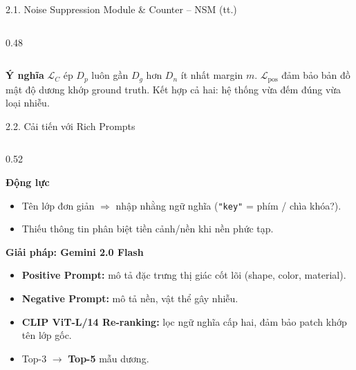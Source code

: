 \documentclass[11pt]{beamer}
\begin{document}
\begin{frame}[shrink=10]{2.1. Noise Suppression Module \& Counter -- NSM (tt.)}
\begin{columns}[T,onlytextwidth]
\begin{column}{0.48\textwidth}
\end{column}
\end{columns}

\vspace{0.3em}

\begin{block}{\textbf{Ý nghĩa}}
$\mathcal{L}_C$ ép $D_p$ luôn gần $D_g$ hơn $D_n$ ít nhất margin $m$. $\mathcal{L}_{\text{pos}}$ đảm bảo bản đồ mật độ dương khớp ground truth. Kết hợp cả hai: hệ thống vừa đếm đúng vừa loại nhiễu.
\end{block}

\end{frame}


\begin{frame}[fragile, shrink=15]{2.2. Cải tiến với Rich Prompts}
\scriptsize

\begin{columns}[T,onlytextwidth]
\begin{column}{0.52\textwidth}

\begin{block}{\textbf{Động lực}}
\begin{itemize}
  \item Tên lớp đơn giản $\Rightarrow$ nhập nhằng ngữ nghĩa (\texttt{"key"} = phím / chìa khóa?).
  \item Thiếu thông tin phân biệt tiền cảnh/nền khi nền phức tạp.
\end{itemize}
\end{block}

\begin{block}{\textbf{Giải pháp: Gemini 2.0 Flash}}
\begin{itemize}
  \item \textbf{Positive Prompt:} mô tả đặc trưng thị giác cốt lõi (shape, color, material).
  \item \textbf{Negative Prompt:} mô tả nền, vật thể gây nhiễu.
  \item \textbf{CLIP ViT-L/14 Re-ranking:} lọc ngữ nghĩa cấp hai, đảm bảo patch khớp tên lớp gốc.
  \item Top-3 $\to$ \textbf{Top-5} mẫu dương.
\end{itemize}
\end{block}


\end{column}
\end{columns}
\end{frame}
\end{document}
